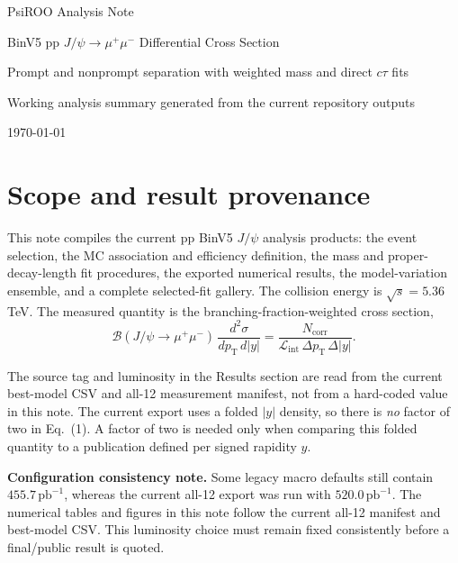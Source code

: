 \documentclass[11pt]{article}
\begin{document}
\begin{titlepage}
\centering
{\Large PsiROO Analysis Note\par}
\vspace{1.5cm}
{\LARGE BinV5 pp $J/\psi\to\mu^+\mu^-$ Differential Cross Section\par}
\vspace{0.5cm}
{\large Prompt and nonprompt separation with weighted mass and direct $c\tau$ fits\par}
\vfill
{\large Working analysis summary generated from the current repository outputs\par}
\vspace{0.5cm}
{\large \today\par}
\end{titlepage}

\tableofcontents
\clearpage

\section{Scope and result provenance}

This note compiles the current pp BinV5 $J/\psi$ analysis products: the event selection, the MC association and efficiency definition, the mass and proper-decay-length fit procedures, the exported numerical results, the model-variation ensemble, and a complete selected-fit gallery. The collision energy is $\sqrt{s}=5.36$ TeV. The measured quantity is the branching-fraction-weighted cross section,
\begin{equation}
\mathcal{B}(J/\psi\to\mu^+\mu^-)\,
\frac{d^2\sigma}{dp_\mathrm{T}\,d|y|} =
\frac{N_\mathrm{corr}}{\mathcal{L}_\mathrm{int}\,\Delta p_\mathrm{T}\,\Delta |y|}.
\end{equation}

The source tag and luminosity in the Results section are read from the current best-model CSV and all-12 measurement manifest, not from a hard-coded value in this note. The current export uses a folded $|y|$ density, so there is \emph{no} factor of two in Eq.~(1). A factor of two is needed only when comparing this folded quantity to a publication defined per signed rapidity $y$.

\textbf{Configuration consistency note.} Some legacy macro defaults still contain $455.7\,\mathrm{pb}^{-1}$, whereas the current all-12 export was run with $520.0\,\mathrm{pb}^{-1}$. The numerical tables and figures in this note follow the current all-12 manifest and best-model CSV. This luminosity choice must remain fixed consistently before a final/public result is quoted.
\end{document}
